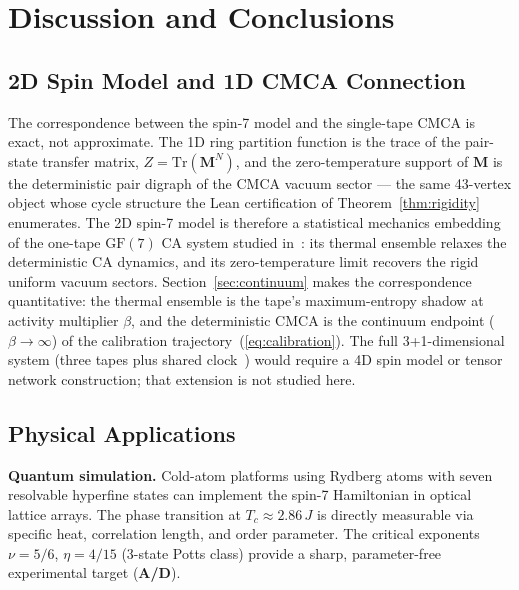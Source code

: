 \documentclass[11pt]{article}
\theoremstyle{remark}
\newcommand{\GF}[1]{\ensuremath{\mathrm{GF}(#1)}}
\newcommand{\CatAD}{\textbf{A/D}}
\begin{document}
\section{Discussion and Conclusions}
\label{sec:discussion}

\subsection{2D Spin Model and 1D CMCA Connection}

The correspondence between the spin-7 model and the single-tape CMCA is exact,
not approximate. The 1D ring partition function is the trace of the pair-state
transfer matrix, $Z = \mathrm{Tr}(\mathbf{M}^N)$, and the zero-temperature
support of $\mathbf{M}$ is the deterministic pair digraph of the CMCA vacuum
sector --- the same 43-vertex object whose cycle structure the Lean
certification of Theorem~\ref{thm:rigidity} enumerates. The 2D spin-7 model is
therefore a statistical mechanics embedding of the one-tape $\GF{7}$ CA system
studied in~\cite{SpivackCMCA}: its thermal ensemble relaxes the deterministic
CA dynamics, and its zero-temperature limit recovers the rigid uniform vacuum
sectors. Section~\ref{sec:continuum} makes the correspondence quantitative:
the thermal ensemble is the tape's maximum-entropy shadow at activity
multiplier $\beta$, and the deterministic CMCA is the continuum endpoint
($\beta \to \infty$) of the calibration trajectory~(\ref{eq:calibration}). The full 3+1-dimensional system (three tapes plus shared
clock~\cite{SpivackThreeTapeCMCA}) would require a 4D spin model or tensor
network construction; that extension is not studied here.

\subsection{Physical Applications}

\noindent\textbf{Quantum simulation.}
Cold-atom platforms using Rydberg atoms with seven resolvable hyperfine states can
implement the spin-7 Hamiltonian in optical lattice arrays. The phase transition at
$T_c \approx 2.86\,J$ is directly measurable via specific heat, correlation length, and
order parameter. The critical exponents $\nu = 5/6$, $\eta = 4/15$ (3-state Potts class)
provide a sharp, parameter-free experimental target (\CatAD{}).
\end{document}
